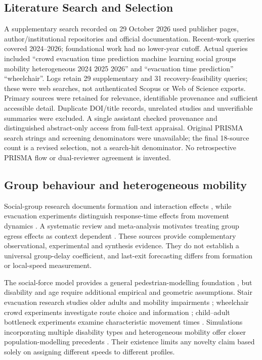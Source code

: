 \subsection{Literature Search and Selection}
A supplementary search recorded on 29 October 2026 used publisher pages, author/institutional repositories and official documentation. Recent-work queries covered 2024--2026; foundational work had no lower-year cutoff. Actual queries included ``crowd evacuation time prediction machine learning social groups mobility heterogeneous 2024 2025 2026'' and ``evacuation time prediction'' ``wheelchair''. Logs retain 29 supplementary and 31 recovery-feasibility queries; these were web searches, not authenticated Scopus or Web of Science exports. Primary sources were retained for relevance, identifiable provenance and sufficient accessible detail. Duplicate DOI/title records, unrelated studies and unverifiable summaries were excluded. A single assistant checked provenance and distinguished abstract-only access from full-text appraisal. Original PRISMA search strings and screening denominators were unavailable; the final 18-source count is a revised selection, not a search-hit denominator. No retrospective PRISMA flow or dual-reviewer agreement is invented.


\subsection{Group behaviour and heterogeneous mobility}
Social-group research documents formation and interaction effects \cite{r1}, while evacuation experiments distinguish response-time effects from movement dynamics \cite{r2}. A systematic review and meta-analysis motivates treating group egress effects as context dependent \cite{L17}. These sources provide complementary observational, experimental and synthesis evidence. They do not establish a universal group-delay coefficient, and last-exit forecasting differs from formation or local-speed measurement.

The social-force model provides a general pedestrian-modelling foundation \cite{L01}, but disability and age require additional empirical and geometric assumptions. Stair evacuation research studies older adults and mobility impairments \cite{L08}; wheelchair crowd experiments investigate route choice and information \cite{L09}; child--adult bottleneck experiments examine characteristic movement times \cite{L10}. Simulations incorporating multiple disability types and heterogeneous mobility offer closer population-modelling precedents \cite{WU,L14}. Their existence limits any novelty claim based solely on assigning different speeds to different profiles.

